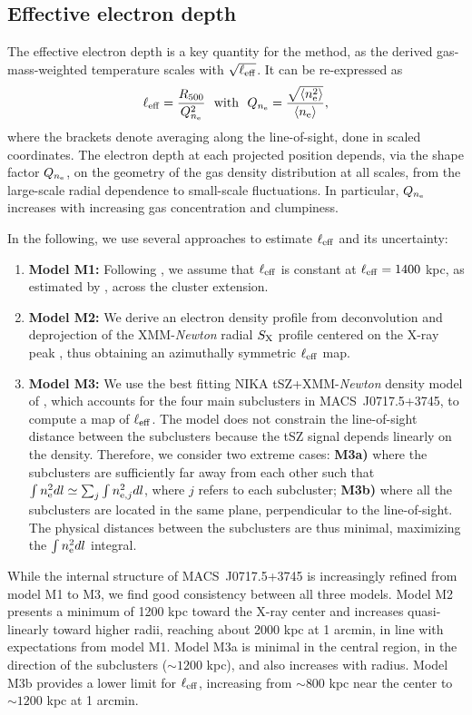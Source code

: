 \documentclass[twocolumn,traditabstract]{aa}
\newcommand{\ccor}[1]{\textcolor{Mypink}{#1}}
\def\xe {n_{\rm e}}
\begin{document}
\subsection{Effective electron depth}
\ccor{The effective electron depth is a key quantity for the method, as the derived gas-mass-weighted temperature scales with $\sqrt{\ell_{\rm eff}}$. It can be re-expressed as
\begin{equation}
\ell_{\rm eff} = \frac{R_{500}}{Q_{n_{\rm e}}^2}~~{\rm with}~~Q_{n_{\rm e}} = \frac{ \sqrt{\langle \xe^2\rangle}}{ \langle\xe\rangle},
\label{eq:Q_ne}
\end{equation}
where the brackets denote averaging along the line-of-sight, done in scaled coordinates. The electron depth at each projected position depends, via the shape factor $Q_{n_{\rm e}}$, on the geometry of the gas density distribution at all scales, from the large-scale radial dependence to small-scale fluctuations. In particular, $Q_{n_{\rm e}}$ increases with increasing gas concentration and clumpiness.}

In the following, we use several approaches to estimate $\ell_{\rm eff}$ and its uncertainty:
\begin{enumerate}
\item {\bf Model M1:} Following \cite{Sayers2013}, we assume that $\ell_{\rm eff}$ is constant at $\ell_{\rm eff}=1400$ kpc, as estimated by \citet{Mroczkowski2012}, across the cluster extension. 
\item {\bf Model M2:} We derive an electron density profile from deconvolution and deprojection of the XMM-\textit{Newton} radial $S_{\rm X}$ profile centered on the X-ray peak \citep{Croston2006}, thus obtaining an azimuthally symmetric $\ell_{\rm eff}$ map. 
\item {\bf Model M3:} We use the best fitting NIKA tSZ+XMM-\textit{Newton} density model of \cite{Adam2016b}, which accounts for the four main subclusters in \mbox{MACS~J0717.5+3745}, to compute a map of $\ell_{\rm eff}$. The model does not constrain the line-of-sight distance between the subclusters because the tSZ signal depends linearly on the density. Therefore, we consider two extreme cases: {\bf M3a)} where the subclusters are sufficiently far away from each other such that $\int n_{\rm e}^2 dl \simeq \sum_j \int n_{{\rm e},j}^2 dl$, where $j$ refers to each subcluster; {\bf M3b)} where all the subclusters are located \ccor{in the same plane, perpendicular to the line-of-sight. The physical distances between the subclusters are thus minimal, maximizing the $\int n_{\rm e}^2 dl$ integral.}
\end{enumerate}
While the internal structure of \mbox{MACS~J0717.5+3745} is increasingly refined from model M1 to M3, we find good consistency between all three models. Model M2 presents a minimum of 1200 kpc toward the X-ray center and increases quasi-linearly toward higher radii, reaching about 2000 kpc at 1 arcmin, in line with expectations from model M1. Model M3a is minimal in the central region, in the direction of the subclusters ($\sim 1200$ kpc), and also increases with radius. Model M3b provides a lower limit for $\ell_{\rm eff}$, increasing from $\sim 800$ kpc near the center to $\sim 1200$ kpc at 1 arcmin.
\end{document}
